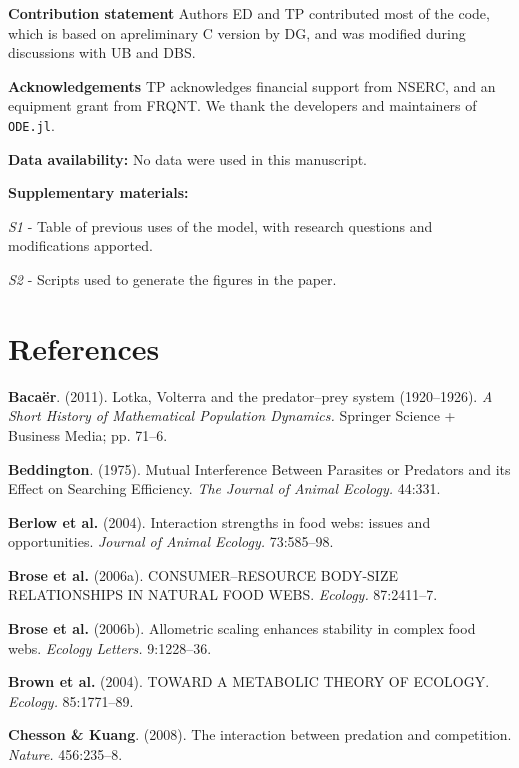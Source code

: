 \documentclass[12pt]{article}
\begin{document}
\textbf{Contribution statement} Authors ED and TP contributed most of
the code, which is based on apreliminary C version by DG, and was
modified during discussions with UB and DBS.

\textbf{Acknowledgements} TP acknowledges financial support from NSERC,
and an equipment grant from FRQNT. We thank the developers and
maintainers of \texttt{ODE.jl}.

\textbf{Data availability:} No data were used in this manuscript.

\textbf{Supplementary materials:}

\emph{S1} - Table of previous uses of the model, with research questions
and modifications apported.

\emph{S2} - Scripts used to generate the figures in the paper.

\section*{References}\label{references}

\hypertarget{refs}{}
\hypertarget{ref-baca11lvp}{}
\textbf{Bacaër}. (2011). Lotka, Volterra and the predator--prey system
(1920--1926). \emph{A Short History of Mathematical Population
Dynamics.} Springer Science + Business Media; pp. 71--6.

\hypertarget{ref-bedd75mip}{}
\textbf{Beddington}. (1975). Mutual Interference Between Parasites or
Predators and its Effect on Searching Efficiency. \emph{The Journal of
Animal Ecology.} 44:331.

\hypertarget{ref-berl04isf}{}
\textbf{Berlow et al.} (2004). Interaction strengths in food webs:
issues and opportunities. \emph{Journal of Animal Ecology.} 73:585--98.

\hypertarget{ref-bros06cbr}{}
\textbf{Brose et al.} (2006a). CONSUMER--RESOURCE BODY-SIZE
RELATIONSHIPS IN NATURAL FOOD WEBS. \emph{Ecology.} 87:2411--7.

\hypertarget{ref-bros06ase}{}
\textbf{Brose et al.} (2006b). Allometric scaling enhances stability in
complex food webs. \emph{Ecology Letters.} 9:1228--36.

\hypertarget{ref-brow04mte}{}
\textbf{Brown et al.} (2004). TOWARD A METABOLIC THEORY OF ECOLOGY.
\emph{Ecology.} 85:1771--89.

\hypertarget{ref-ches08ipc}{}
\textbf{Chesson \& Kuang}. (2008). The interaction between predation and
competition. \emph{Nature.} 456:235--8.
\end{document}
